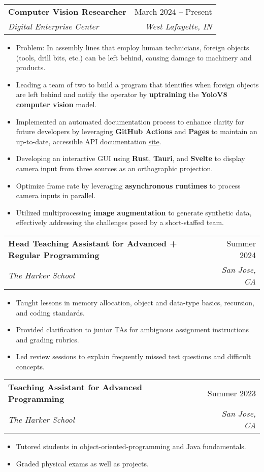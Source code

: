 \documentclass[letterpaper,11pt]{article}
\makeatletter
\newcommand{\resumeItem}[1]{
  \item\small{
    {#1 \vspace{-2pt}}
  }
}
\newcommand{\resumeSubheading}[4]{
  \vspace{-2pt}\item
    \begin{tabular*}{0.97\textwidth}[t]{l@{\extracolsep{\fill}}r}
      \textbf{#1} & #2 \\
      \textit{\small#3} & \textit{\small #4} \\
    \end{tabular*}\vspace{-7pt}
}
\newcommand{\resumeItemListStart}{\begin{itemize}}
\newcommand{\resumeItemListEnd}{\end{itemize}\vspace{-5pt}}
\makeatother
\begin{document}
    \resumeSubheading
      {Computer Vision Researcher}{March 2024 – Present}
      {Digital Enterprise Center}{West Lafayette, IN}
      \resumeItemListStart
        \resumeItem{Problem: In assembly lines that employ human technicians, foreign objects (tools, drill bits, etc.) can be left behind, causing damage to machinery and products.}
        \resumeItem{Leading a team of two to build a program that identifies when foreign objects are left behind and notify the operator by \textbf{uptraining} the \textbf{YoloV8 computer vision} model.
        }
        \resumeItem{Implemented an automated documentation process to enhance clarity for future developers by leveraging \textbf{GitHub Actions} and \textbf{Pages} to maintain an up-to-date, accessible API documentation \href{https://jlz22.github.io/Computer-Vision-for-FOD/index.html}{\underline{site}}.}
        \resumeItem{Developing an interactive GUI using \textbf{Rust}, \textbf{Tauri}, and \textbf{Svelte} to display camera input from three sources as an orthographic projection. 
        }
        \resumeItem{Optimize frame rate by leveraging \textbf{asynchronous runtimes} to process camera inputs in parallel.}
        \resumeItem{Utilized multiprocessing \textbf{image augmentation} to generate synthetic data, effectively addressing the challenges posed by a short-staffed team.
        }
        \resumeItemListEnd
      
    \resumeSubheading
      {Head Teaching Assistant for Advanced + Regular Programming}{Summer 2024}
      {The Harker School}{San Jose, CA}
      \resumeItemListStart
        \resumeItem{Taught lessons in memory allocation, object and data-type basics, recursion, and coding standards.
        }
        \resumeItem{Provided clarification to junior TAs for ambiguous assignment instructions and grading rubrics.
        }
        \resumeItem{Led review sessions to explain frequently missed test questions and difficult concepts.
        }
      \resumeItemListEnd

    \resumeSubheading
    {Teaching Assistant for Advanced Programming}{Summer 2023}
    {The Harker School}{San Jose, CA}
      \resumeItemListStart
        \resumeItem{Tutored students in object-oriented-programming and Java fundamentals.}
        \resumeItem{Graded physical exams as well as projects.}
        \resumeItemListEnd
      
\end{document}
